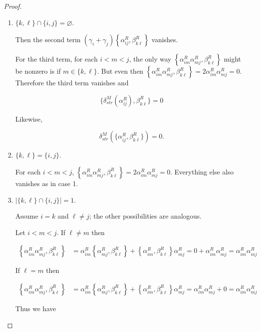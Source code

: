 \documentclass[a4paper,final, reqno]{amsart}
\theoremstyle{plain}
\theoremstyle{definition}
\begin{document}
\begin{proof}
\begin{itemize}
			\begin{enumerate}[label=Case \arabic*.]
				\item $\{k,\ell\} \cap \{i,j\} = \varnothing$.
				
				Then the second term $(\gamma_i+\gamma_j)\left\{ \alpha_{ij}^R, \beta_{k\ell}^R \right\}$ vanishes. 
				
				For the third term, for each $i<m<j$, the only way $\left\{\alpha_{im}^R\alpha_{mj}^R, \beta_{k\ell}^R \right\}$ might be nonzero is if $m\in \{k,\ell\}$. But even then $\left\{\alpha_{im}^R\alpha_{mj}^R, \beta_{k\ell}^R \right\} = 2\alpha_{im}^R\alpha_{mj}^R = 0$. Therefore the third term vanishes and 
				
				\[ \{\delta_{str}^M(\alpha_{ij}^R), \beta_{k\ell}^R\} = 0\]
				
				Likewise, 
				
				\[ \delta_{str}^M\left(\{\alpha_{ij}^R,\beta_{k\ell}^R\}\right) = 0. \]
				
				\item $\{k, \ell\} = \{i,j\}$.
				
				For each $i<m<j$, $\left\{\alpha_{im}^R\alpha_{mj}^R, \beta_{k\ell}^R \right\} = 2\alpha_{im}^R\alpha_{mj}^R = 0$. Everything else also vanishes as in case 1.
				
				\item $|\{k,\ell\} \cap \{i,j\}| = 1$. 
				
				Assume $i=k$ and $\ell\neq j$; the other possibilities are analogous.
				
				Let $i<m<j$. If $\ell \neq m$ then
				
				\begin{align*}
					\left\{\alpha_{im}^R\alpha_{mj}^R, \beta_{k\ell}^R \right\} &= \alpha_{im}^R\left\{\alpha_{mj}^R, \beta_{k\ell}^R \right\} + \left\{\alpha_{im}^R, \beta_{k\ell}^R \right\}\alpha_{mj}^R =  0+\alpha_{im}^R\alpha_{mj}^R = \alpha_{im}^R\alpha_{mj}^R
				\end{align*}
				
				If $\ell = m$ then
				
				\begin{align*}
					\left\{\alpha_{im}^R\alpha_{mj}^R, \beta_{k\ell}^R \right\} &= \alpha_{im}^R\left\{\alpha_{mj}^R, \beta_{k\ell}^R \right\} + \left\{\alpha_{im}^R, \beta_{k\ell}^R \right\}\alpha_{mj}^R =  \alpha_{im}^R\alpha_{mj}^R+0 = \alpha_{im}^R\alpha_{mj}^R
				\end{align*}
				
				Thus we have 
				

\end{enumerate}
\end{itemize}
\end{proof}
\end{document}
